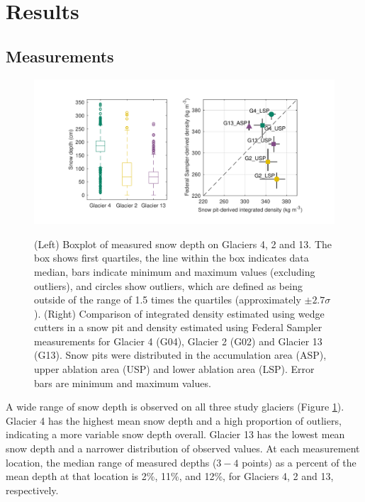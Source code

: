 \documentclass[review,oneside, letterpaper]{igs}
\begin{document}
\section{Results}

\subsection{Measurements}

\begin{figure}
	\centering
	\includegraphics[width =\textwidth]{DepthBoxplot_SPvsFS.pdf}\\
	\caption{(Left) Boxplot of measured snow depth on Glaciers 4, 2 and 13. The box shows first quartiles, the line within the box indicates data median, bars indicate minimum and maximum values (excluding outliers), and circles show outliers, which are defined as being outside of the range of 1.5 times the quartiles (approximately $\pm2.7\sigma$). (Right) Comparison of integrated density estimated using wedge cutters in a snow pit and density estimated using Federal Sampler measurements for Glacier 4 (G04), Glacier 2 (G02) and Glacier 13 (G13). Snow pits were distributed in the accumulation area (ASP), upper ablation area (USP) and lower ablation area (LSP). Error bars are minimum and maximum values.}
	\label{fig:DepthBoxplot_SPvsFS}
\end{figure}

A wide range of snow depth is observed on all three study glaciers (Figure \ref{fig:DepthBoxplot_SPvsFS}). Glacier 4 has the highest mean snow depth and a high proportion of outliers, indicating a more variable snow depth overall. Glacier 13 has the lowest mean snow depth and a narrower distribution of observed values. At each measurement location, the median range of measured depths ($3-4$ points) as a percent of the mean depth at that location is 2\%, 11\%, and 12\%, for Glaciers 4, 2 and 13, respectively. 
\end{document}

